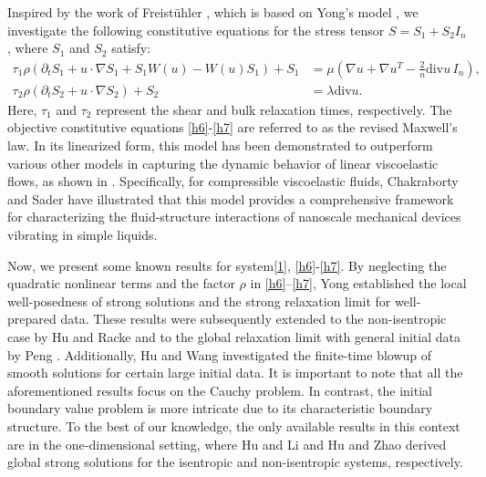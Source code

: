 \documentclass[10pt,reqno]{amsart}
\numberwithin{equation}{section}
\begin{document}
	
	Inspired by the work of Freistühler \cite{freistuhler2020galilei}, which is based on Yong's model \cite{yong2014newtonian}, we investigate the following constitutive equations for the stress tensor \( S = S_1 + S_2 I_n \), where \( S_1 \) and \( S_2 \) satisfy:
	\begin{align}
		\tau_1 \rho \left( \partial_t S_1 + u \cdot \nabla S_1 + S_1 W(u) - W(u) S_1 \right) + S_1 &= \mu \left( \nabla u + \nabla u^T - \frac{2}{n} \mathrm{div} u \, I_n \right), \label{h6} \\
		\tau_2 \rho \left( \partial_t S_2 + u \cdot \nabla S_2 \right) + S_2 &= \lambda \mathrm{div} u. \label{h7}
	\end{align}
	Here, \( \tau_1 \) and \( \tau_2 \) represent the shear and bulk relaxation times, respectively. The objective constitutive equations \eqref{h6}-\eqref{h7} are referred to as the revised Maxwell's law. In its linearized form, this model has been demonstrated to outperform various other models in capturing the dynamic behavior of linear viscoelastic flows, as shown in \cite{chakraborty2015constitutive}. Specifically, for compressible viscoelastic fluids, Chakraborty and Sader \cite{chakraborty2015constitutive} have illustrated that this model provides a comprehensive framework for characterizing the fluid-structure interactions of nanoscale mechanical devices vibrating in simple liquids.
	
	Now, we present some known results for system\eqref{1}, \eqref{h6}-\eqref{h7}. By neglecting the quadratic nonlinear terms  and the factor $\rho$  in \eqref{h6}–\eqref{h7}, Yong \cite{yong2014newtonian} established the local well-posedness of strong solutions and the strong relaxation limit for well-prepared data. These results were subsequently extended to the non-isentropic case by Hu and Racke \cite{hu2017compressible} and to the global relaxation limit with general initial data by Peng \cite{peng2021relaxed}. Additionally, Hu and Wang \cite{HWAML} investigated the finite-time blowup of smooth solutions for certain large initial data. It is important to note that all the aforementioned results focus on the Cauchy problem. In contrast, the initial boundary value problem is more intricate due to its characteristic boundary structure. To the best of our knowledge, the only available results in this context are in the one-dimensional setting, where Hu and Li \cite{HL24} and Hu and Zhao \cite{HZ25} derived global strong solutions for the isentropic and non-isentropic systems, respectively.
	
\end{document}
